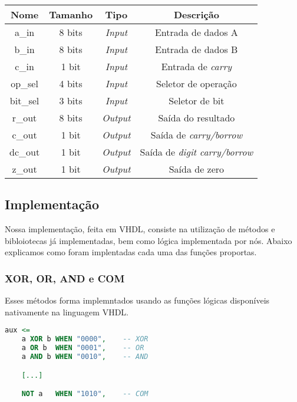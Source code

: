 \documentclass{article}
\begin{document}
\begin{center}
\begin{tabular}{|c|c|c|c|}
    \hline
    Nome & Tamanho & Tipo & Descrição\\
    \hline
    a\_in & 8 bits & \textit{Input} & Entrada de dados A\\
    \hline
    b\_in & 8 bits & \textit{Input} & Entrada de dados B\\
    \hline
    c\_in & 1 bit & \textit{Input} & Entrada de \textit{carry}\\
    \hline
    op\_sel & 4 bits & \textit{Input} & Seletor de operação\\
    \hline
    bit\_sel & 3 bits & \textit{Input} & Seletor de bit\\
    \hline
    r\_out & 8 bits & \textit{Output} & Saída do resultado\\
    \hline
    c\_out & 1 bit & \textit{Output} & Saída de \textit{carry/borrow}\\
    \hline
    dc\_out & 1 bit & \textit{Output} & Saída de \textit{digit carry/borrow}\\
    \hline
    z\_out & 1 bit & \textit{Output} & Saída de zero\\
    \hline
\end{tabular}
\end{center}

\subsection{Implementação}

Nossa implementação, feita em VHDL, consiste na utilização de métodos e bibloiotecas já implementadas, bem como lógica implementada por nós. Abaixo explicamos como foram implentadas cada uma das funções proportas.

\subsubsection{XOR, OR, AND e COM}

Esses métodos forma implemntados usando as funções lógicas disponíveis nativamente na linguagem VHDL.

\begin{lstlisting}[language=VHDL]
aux <=
    a XOR b WHEN "0000",    -- XOR
    a OR b  WHEN "0001",    -- OR
    a AND b WHEN "0010",    -- AND

    [...]

    NOT a   WHEN "1010", 	-- COM
\end{lstlisting}
\end{document}
